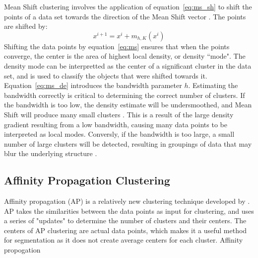 Mean Shift clustering involves the application of equation~\ref{eq:ms_sh} to shift the points of a data set towards the direction of the Mean Shift vector \citet{vatturi09}. 
The points are shifted by: 
\begin{equation}
\label{eq:ms}
x^{i+1} = x^i + m_{h,K}(x^i)
\end{equation}
Shifting the data points by equation~\ref{eq:ms} ensures that when the points converge, the center is the area of highest local density, or density ``mode". 
The density mode can be interpretted as the center of a significant cluster in the data set, and is used to classify the objects that were shifted towards it.
Equation~\ref{eq:ms_de} introduces the bandwidth parameter $h$. 
Estimating the bandwidth correctly is critical to determining the correct number of clusters.
If the bandwidth is too low, the density estimate will be undersmoothed, and Mean Shift will produce many small clusters \citet{vatturi09}. This is a result of the large density gradient resulting from a low bandwidth, causing many data points to be interpreted as local modes.
Conversly, if the bandwidth is too large, a small number of large clusters will be detected, resulting in groupings of data that may blur the underlying structure \citet{vatturi09}.

\subsection{Affinity Propagation Clustering}

Affinity propagation (AP) is a relatively new clustering technique developed by \citet{frey07}.
AP takes the similarities between the data points as input for clustering, and uses a series of "updates" to determine the number of clusters and their centers. 
The centers of AP clustering are actual data points, which makes it a useful method for segmentation as it does not create average centers for each cluster. 
Affinity propogation 

